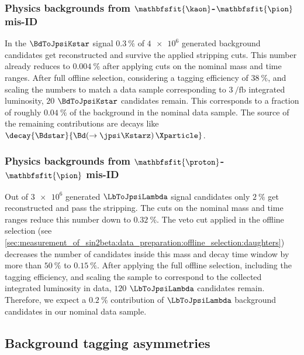 \subsubsection{Physics backgrounds from $\mathbfsfit{\kaon}$-$\mathbfsfit{\pion}$ mis-ID}
\label{sec:measurement_of_sin2beta:physic_backgrounds:physic_backgrounds:kstar}

In the $\BdToJpsiKstar$ signal \MC $\SI{0.3}{\percent}$ of $\num{4e6}$ generated
background candidates get reconstructed and survive the applied stripping cuts.
This number already reduces to $\SI{0.004}{\percent}$ after applying cuts on the
nominal mass and time ranges. After full offline selection, considering a
tagging efficiency of $\SI{38}{\percent}$, and scaling the numbers to match a
data sample corresponding to
$\SI[separate-uncertainty=true]{3}{\per\femto\barn}$ integrated luminosity,
$\num{20}$ $\BdToJpsiKstar$ candidates remain. This corresponds to a fraction of
roughly $\SI{0.04}{\percent}$ of the background in the nominal data sample. The
source of the remaining contributions are \eg decays like
$\decay{\Bdstar}{\Bd(\to\jpsi\Kstarz)\,\Xparticle}$.

\subsubsection{Physics backgrounds from $\mathbfsfit{\proton}$-$\mathbfsfit{\pion}$ mis-ID}
\label{sec:measurement_of_sin2beta:physic_backgrounds:physic_backgrounds:lambda}

Out of $\num{3e6}$ generated $\LbToJpsiLambda$ signal candidates only
$\SI{2}{\percent}$ get reconstructed and pass the stripping. The cuts on the
nominal mass and time ranges reduce this number down to $\SI{0.32}{\percent}$.
The veto cut applied in the offline selection (see
\cref{sec:measurement_of_sin2beta:data_preparation:offline_selection:daughters})
decreases the number of candidates inside this mass and decay time window by
more than $\SI{50}{\percent}$ to $\SI{0.15}{\percent}$. After applying the full
offline selection, including the tagging efficiency, and scaling the sample to
correspond to the collected integrated luminosity in data, $\num{120}$
$\LbToJpsiLambda$ candidates remain. Therefore, we expect a $\SI{0.2}{\percent}$
contribution of $\LbToJpsiLambda$ background candidates in our nominal data
sample.

\subsection{Background tagging asymmetries}
\label{sec:measurement_of_sin2beta:physic_backgrounds:tagging_asymmetries}

